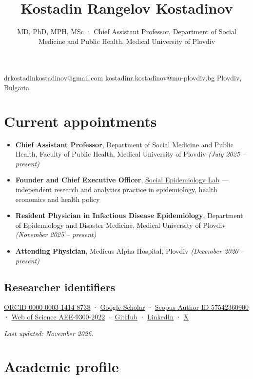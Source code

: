 \documentclass[
  10.5pt,
  a4paper,
  DIV=11,
  numbers=noendperiod]{scrartcl}
\title{Kostadin Rangelov Kostadinov}
\subtitle{MD, PhD, MPH, MSc · Chief Assistant Professor, Department of
Social Medicine and Public Health, Medical University of Plovdiv}
\author{}
\date{}
\providecommand{\tightlist}{%
  \setlength{\itemsep}{0pt}\setlength{\parskip}{0pt}}
\begin{document}
\maketitle


drkostadinkostadinov@gmail.com \textbar{}
kostadinr.kostadinov@mu-plovdiv.bg \textbar{} Plovdiv, Bulgaria

\section{Current appointments}\label{current-appointments}

\begin{itemize}
\tightlist
\item
  \textbf{Chief Assistant Professor}, Department of Social Medicine and
  Public Health, Faculty of Public Health, Medical University of Plovdiv
  \emph{(July 2025 -- present)}
\item
  \textbf{Founder and Chief Executive Officer}, \href{lab.qmd}{Social
  Epidemiology Lab} --- independent research and analytics practice in
  epidemiology, health economics and health policy
\item
  \textbf{Resident Physician in Infectious Disease Epidemiology},
  Department of Epidemiology and Disaster Medicine, Medical University
  of Plovdiv \emph{(November 2025 -- present)}
\item
  \textbf{Attending Physician}, Medicus Alpha Hospital, Plovdiv
  \emph{(December 2020 -- present)}
\end{itemize}

\subsection{Researcher identifiers}\label{researcher-identifiers}

\href{https://orcid.org/0000-0003-1414-8738}{ORCID 0000-0003-1414-8738}
·
\href{https://scholar.google.com/citations?user=nQOcsJkAAAAJ&hl=en}{Google
Scholar} ·
\href{https://www.scopus.com/authid/detail.uri?authorId=57542360900}{Scopus
Author ID 57542360900} ·
\href{https://www.webofscience.com/wos/author/record/AEE-9300-2022}{Web
of Science AEE-9300-2022} ·
\href{https://github.com/kostadinoff}{GitHub} ·
\href{https://www.linkedin.com/in/kostadinovmd/}{LinkedIn} ·
\href{https://x.com/kostadinoffMD}{X}

\emph{Last updated: November 2026.}

\section{Academic profile}\label{academic-profile}
\end{document}
